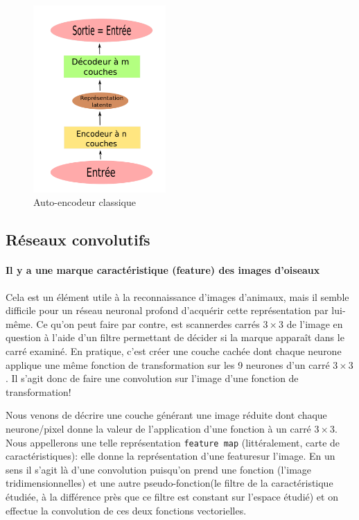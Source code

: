 \documentclass[a4paper, 11pt, onecolumn]{article}
\begin{document}
\begin{figure}
  \includegraphics[width=0.45\textwidth]{Autoencoder}
  \caption{Auto-encodeur classique}
\end{figure}

\subsection{Réseaux convolutifs}

\paragraph{Il y a une marque caractéristique (feature) des images d'oiseaux}

Cela est un élément utile à la reconnaissance d'images d'animaux, mais il semble
difficile pour un réseau neuronal profond d'acquérir cette représentation par
lui-même. Ce qu'on peut faire par contre, est \og
scanner\fg des carrés $3\times 3$ de l'image en question à l'aide d'un filtre
permettant de décider si la marque apparaît dans le carré examiné. En pratique, c'est créer une couche cachée
dont chaque neurone applique une même fonction de transformation sur les 9 neurones d'un
carré $3\times 3$. Il s'agit donc de faire une convolution sur l'image d'une
fonction de transformation!

Nous venons de décrire une couche générant une image réduite dont chaque
neurone/pixel donne la valeur de l'application d'une fonction à un carré
$3\times 3$. Nous appellerons une telle représentation \texttt{feature map}
(littéralement, carte de caractéristiques):
elle donne la représentation d'une \og feature\fg sur l'image. En un sens il
s'agit là d'une convolution puisqu'on prend une fonction (l'image
tridimensionnelles) et une autre \og pseudo-fonction\fg (le filtre de la
caractéristique étudiée, à la différence près que ce filtre est constant sur
l'espace étudié) et on effectue la convolution de ces deux fonctions vectorielles.
\end{document}
